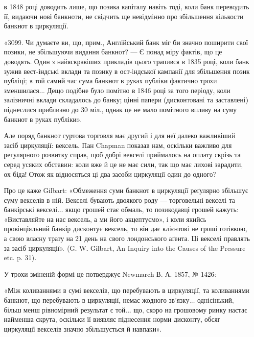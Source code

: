 в 1848 році доводить лише, що позика капіталу навіть тоді, коли банк переводить
її, видаючи нові банкноти, не свідчить ще невідмінно про збільшення
кількости банкнот в циркуляції.

«3099. Чи думаєте ви, що, прим., Англійський банк міг би значно поширити
свої позики, не збільшуючи видання банкнот? — Є понад міру фактів, що
це доводять. Один з найяскравіших прикладів цього трапився в 1835 році, коли
банк зужив вест-індські вклади та позику в ост-індської кампанії для збільшення
позик публіці; в той самий час сума банкнот в руках публіки фактично
трохи зменшилася... Дещо подібне було помітно в 1846 році за того періоду,
коли залізничні вклади складалось до банку; цінні папери (дисконтовані та
заставлені) піднеслися приблизно до 30 міл., однак це не мало помітного
впливу на суму банкнот в руках публіки».

Але поряд банкнот гуртова торговля має другий і для неї далеко важливіший
засіб циркуляції: вексель. Пан Chapman показав нам, оскільки важливо
для регулярного розвитку справ, щоб добрі векселі приймалось на оплату скрізь
та серед усяких обставин: коли вже й це не має сили, так що має лихові
зарадити, ох біда! Отож як відносяться ці два засоби циркуляції один до одного?

Про це каже Gilbart: «Обмеження суми банкнот в циркуляції реґулярно
збільшує суму векселів в ній. Векселі бувають двоякого роду — торговельні
векселі та банкірські векселі... якщо грошей стає обмаль, то позикодавці
грошей кажуть: «Виставляйте на нас вексель, а ми його акцептуємо», і коли
якийсь провінціяльний банкір дисконтує вексель, то він дає клієнтові не гроші
готівкою, а свою власну трату на 21 день на свого лондонського аґента. Ці
векселі правлять за засіб циркуляції». (G. W. Gilbart, An Inquiry into the Causes
of the Pressure etc. p. 31).

У трохи зміненій формі це потверджує Newmarch В. А. 1857, № 1426:

«Між коливаннями в сумі векселів, що перебувають в циркуляції, та
коливаннями банкнот, що перебувають в циркуляції, немає жодного зв’язку...
однісінький, більш менш рівномірний результат є той... що, скоро на грошовому
ринку настає найменша скрута, оскільки її виявляє піднесення норми дисконту,
обсяг циркуляції векселів значно збільшується й навпаки».

